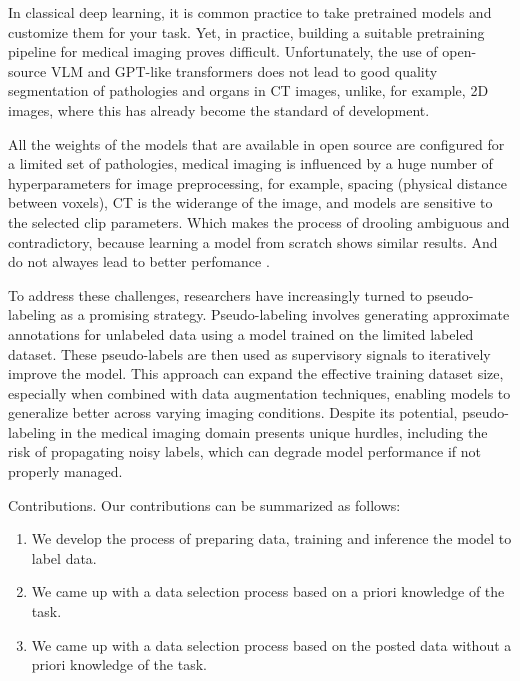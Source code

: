 \documentclass{article}
\begin{document}
In classical deep learning, it is common practice to take pretrained models \cite{tan2019efficientnet} and customize them for your task. Yet, in practice, building a suitable pretraining pipeline for medical imaging proves difficult. 
Unfortunately, the use of open-source VLM \cite{meng2024few} and GPT-like transformers \cite{jiang2024increasing} does not lead to good quality segmentation of pathologies and organs in CT images, unlike, for example, 2D images, where this has already become the standard of development.

All the weights of the models that are available in open source are configured for a limited set of pathologies, medical imaging is influenced by a huge number of hyperparameters for image preprocessing, for example, spacing (physical distance between voxels), CT is the widerange of the image, and models are sensitive to the selected clip parameters. Which makes the process of drooling ambiguous and contradictory, because learning a model from scratch shows similar results. And do not alwayes lead to better perfomance \cite{vanberlo2024survey}.

To address these challenges, researchers have increasingly turned to pseudo-labeling as a promising strategy. Pseudo-labeling involves generating approximate annotations for unlabeled data using a model trained on the limited labeled dataset. These pseudo-labels are then used as supervisory signals to iteratively improve the model. This approach can expand the effective training dataset size, especially when combined with data augmentation techniques, enabling models to generalize better across varying imaging conditions. Despite its potential, pseudo-labeling in the medical imaging domain presents unique hurdles, including the risk of propagating noisy labels, which can degrade model performance if not properly managed.

Contributions. Our contributions can be summarized as follows:
\begin{enumerate}
    \item We develop the process of preparing data, training and inference the model to label data.
    \item We came up with a data selection process based on a priori knowledge of the task.
    \item We came up with a data selection process based on the posted data without a priori knowledge of the task.
\end{enumerate}
\end{document}
